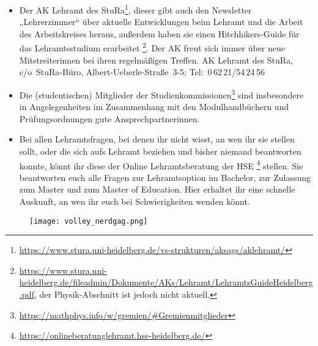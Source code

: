 \begin{itemize}
    \item Der AK Lehramt des StuRa\footnote{\url{https://www.stura.uni-heidelberg.de/vs-strukturen/aksags/aklehramt/}}, dieser gibt auch den Newsletter „Lehrerzimmer“ über aktuelle Entwicklungen beim Lehramt und die Arbeit des Arbeitskreises heraus, außerdem haben sie einen Hitchhikers-Guide für das Lehramtsstudium erarbeitet \footnote{\url{https://www.stura.uni-heidelberg.de/fileadmin/Dokumente/AKs/Lehramt/LehramtsGuideHeidelberg.pdf}, der Physik-Abschnitt ist jedoch nicht aktuell.}. Der AK freut sich immer über neue Mitstreiterinnen bei ihren regelmäßigen Treffen.  \newline AK Lehramt des StuRa, c/o~StuRa-Büro, Albert-Ueberle-Straße~3-5; Tel:~0\,62\,21/54\,24\,56

    \item Die (studentischen) Mitglieder der Studienkommissionen\footnote{\url{https://mathphys.info/w/gremien/\#Gremienmitglieder}} sind insbesondere in Angelegenheiten im Zusammenhang mit den Modulhandbüchern und Prüfungsordnungen gute Ansprechpartnerinnen.

    \item Bei allen Lehramtsfragen, bei denen ihr nicht wisst, an wen ihr sie stellen sollt, oder die sich aufs Lehramt beziehen und bisher niemand beantworten konnte, könnt ihr diese der Online Lehramtsberatung der HSE \footnote{\url{https://onlineberatunglehramt.hse-heidelberg.de/}} stellen. Sie beantworten euch alle Fragen zur Lehramtsoption im Bachelor, zur Zulassung zum Master und zum Master of Education. Hier erhaltet ihr eine schnelle Auskunft, an wen ihr euch bei Schwierigkeiten wenden könnt.


\end{itemize}



\begin{figure}[h]
    \centering
    \texttt{[image: volley\_nerdgag.png]}
\end{figure}

